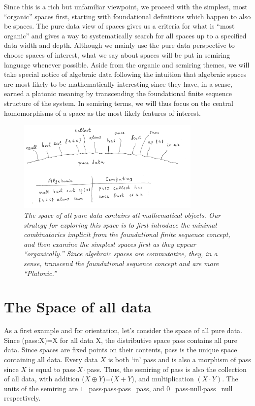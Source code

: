 \documentclass[11pt]{article}
\begin{document}
Since this is a rich but unfamiliar 
viewpoint, we proceed with the simplest, most ``organic'' spaces first, starting with foundational definitions which happen to also 
be spaces.  The pure data view of spaces gives us a criteria for what is ``most organic'' and gives a way to systematically 
search for all spaces up to a specified data width and depth.  Although we mainly use the pure data perspective to 
choose spaces of interest, what we say about spaces will be put in semiring language whenever possible.  Aside from 
the organic and semiring themes, we will take special notice of algebraic data following the intuition that algebraic 
spaces are most likely to be mathematically interesting since they have, in a sense, earned a platonic meaning by 
transcending the foundational finite sequence structure of the system.  In semiring terms, we will thus focus on
the central homomorphisms of a space as the most likely features of interest. 

\begin{figure}[h]
\centering
\includegraphics[width=0.8\textwidth]{garden1.png}
\caption{{\it The space of all pure data contains all mathematical objects.  Our strategy for exploring this space is to first introduce 
the minimal combinatorics implicit from the foundational finite sequence concept, and then examine the simplest spaces first as they 
appear ``organically.''  Since algebraic spaces are commutative, they, in a sense, transcend the foundational sequence concept and are more ``Platonic.''}}
\end{figure}

\section{The Space of all data} 

     As a first example and for orientation, let's consider the space of all pure data.  Since (pass:X)=X for all data X, the distributive space pass 
contains all pure data.  Since spaces are fixed points on their contents, pass is the unique space containing all data.  Every data $X$ is both `in' pass
and is also a morphism of pass since $X$ is equal to pass$\cdot X\cdot$pass.  Thus, the semiring of pass is also the collection of all data, with 
addition ($X\oplus Y$)=($X+Y$), and multiplication $(X\cdot Y)$.  The units of the semiring are $1$=pass$\cdot$pass$\cdot$pass=pass, 
and $0$=pass$\cdot$null$\cdot$pass=null respectively.   
\end{document}
